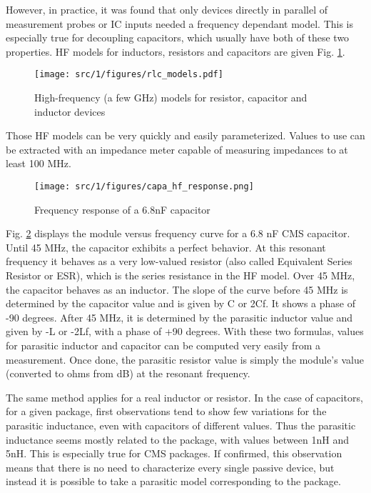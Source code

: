 However, in practice, it was found that only devices directly in parallel of measurement probes or IC inputs needed a frequency dependant model.
This is especially true for decoupling capacitors, which usually have both of these two properties.
HF models for inductors, resistors and capacitors are given Fig. \ref{fig:rlc-esd-models}.

\begin{figure}[!h]
  \centering
  \texttt{[image: src/1/figures/rlc\_models.pdf]}
  \caption{High-frequency (a few GHz) models for resistor, capacitor and inductor devices}
  \label{fig:rlc-esd-models}
\end{figure}

Those HF models can be very quickly and easily parameterized.
Values to use can be extracted with an impedance meter capable of measuring impedances to at least 100 MHz.

\begin{figure}[!h]
  \centering
  \texttt{[image: src/1/figures/capa\_hf\_response.png]}
  \caption{Frequency response of a 6.8nF capacitor}
  \label{fig:frequency-response-capa}
\end{figure}

Fig. \ref{fig:frequency-response-capa} displays the module versus frequency curve for a 6.8 nF CMS capacitor.
Until 45 MHz, the capacitor exhibits a perfect behavior.
At this resonant frequency it behaves as a very low-valued resistor (also called Equivalent Series Resistor or ESR), which is the series resistance in the HF model.
Over 45 MHz, the capacitor behaves as an inductor.
The slope of the curve before 45 MHz is determined by the capacitor value and is given by C\textomega{} or 2\textomega{}Cf.
It shows a phase of -90 degrees.
After 45 MHz, it is determined by the parasitic inductor value and given by -L\textomega{} or -2\textomega{}Lf, with a phase of +90 degrees.
With these two formulas, values for parasitic inductor and capacitor can be computed very easily from a measurement.
Once done, the parasitic resistor value is simply the module’s value (converted to ohms from dB) at the resonant frequency.

The same method applies for a real inductor or resistor.
In the case of capacitors, for a given package, first observations tend to show few variations for the parasitic inductance, even with capacitors of different values.
Thus the parasitic inductance seems mostly related to the package, with values between 1nH and 5nH.
This is especially true for CMS packages.
If confirmed, this observation means that there is no need to characterize every single passive device, but instead it is possible to take a parasitic model corresponding to the package.

